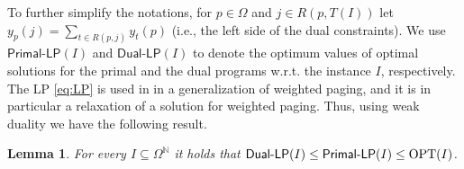 \documentclass[11pt]{article}
\newcommand{\comment}[1]{}
\newcommand{\OPT}{\textnormal{OPT}}
\newcommand{\om}{{\Omega}}
\newtheorem{lemma}[thm]{Lemma}
\begin{document}
{To further simplify the notations, for $p \in \om$ and $j \in R(p,T(I))$ let $y_p(j) = \sum_{t \in R(p,j)} y_t(p)$ (i.e., the left side of the dual constraints). We use $\textsf{Primal-LP}(I)$ and $\textsf{Dual-LP}(I)$ to denote the optimum values of optimal solutions for the primal and the dual programs w.r.t. the instance $I$, respectively. 
The LP \eqref{eq:LP} is used in \cite{bansal2012randomized} in a generalization of weighted paging, and it is in particular a relaxation of a solution for weighted paging. Thus, using weak duality we have the following result. 
	\begin{lemma}
	\label{lem:relaxation}
	For every $I \subseteq \om^{\mathbb{N}}$ it holds that $\textnormal{\textsf{Dual-LP}}(I) \leq \textnormal{\textsf{Primal-LP}}(I) \leq \OPT(I)$. 
\end{lemma}



\comment{
In \cite{bansal2012randomized}, an online deterministic algorithm is presented, which finds an $O(\ln (k))$-competitive feasible (fractional) solution for \eqref{eq:LP} using the online primal-dual method. We use this algorithm here as a black box, where the next result lists the important attributes of the solution obtained in \cite{bansal2012randomized} for our purposes.  

	\begin{lemma}
	\label{lem:fractional}
	Let $I \subseteq \om^{\mathbb{N}}$. There is an algorithm \textnormal{\textsf{Fractional}} that for every $t \in T(I)$ returns a feasible solution $x^t$ for $\textnormal{\textsf{LP}}(I \cap t)$ such that the following holds. 
	\begin{enumerate}
		\item $x^t_{I_t}(r(I_t,t)) = 0$ and $x^t_p(r(p,t))\leq1$ for all $p \in \om, t \in T(I)$. 
		\item $x^t_p(r(p,t)) \geq x^{t-1}_p(r(p,t))$ for all $p \in \om-I_t, t \in T(I)$ (monotonicity). 
		
		\item $x^t_p(j) = x^{t'}_p(j)$ for all $t',t \in T(I), t'<t$, $p \in \om$, $j \in \{0,1,\ldots, r(p,t)-1\}$  (no regrets).   
		\item $\sum_{p \in \om~} \sum_{j \in r(p,T(I))} c(p) \cdot x^{T(I)}_p(j) \leq 2 \cdot \ln (k+1) \cdot \OPT(I)$ (competitive ratio).  
	\end{enumerate}
\end{lemma}



}



}
\end{document}

